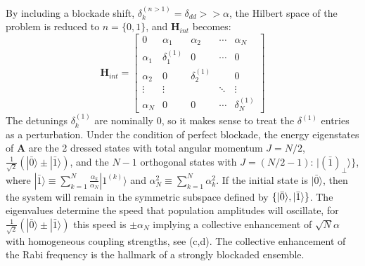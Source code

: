By including a blockade shift, $\delta^{(n>1)}_k = \delta_{dd} >> \alpha$, the Hilbert space of the problem is reduced to $n=\{0,1\}$, and $\mathbf{H}_{int}$ becomes:
\begin{equation}
  \label{eqn_hintsimp}
  \mathbf{H}_{int} = \begin{bmatrix}
    0 & \alpha_1 & \alpha_2 & \cdots & \alpha_N \\
    \alpha_1 & \delta_1^{(1)} & 0 & \cdots & 0 \\
    \alpha_2 & 0 & \delta_2^{(1)} &  & 0 \\
    \vdots & \vdots & & \ddots  & \vdots \\
    \alpha_N & 0 & 0 & \cdots & \delta_N^{(1)} 
  \end{bmatrix}
\end{equation}
The detunings $\delta_k^{(1)}$ are nominally 0, so it makes sense to treat the $\delta^{(1)}$ entries as a perturbation.
Under the condition of perfect blockade, the energy eigenstates of $\mathbf{A}$ are the 2 dressed states with total angular momentum $J = N/2$, $\frac{1}{\sqrt{2}}\left(|\bar{0}\rangle \pm |\bar{1}\rangle\right)$, and the $N-1$ orthogonal states with $J = (N/2 -1)$: $|(\bar{1})_{\perp}\rangle\}$, where $|\bar{1}\rangle \equiv \sum_{k=1}^N \frac{\alpha_k}{\alpha_N}|1^{(k)}\rangle$ and $\alpha_N^2 \equiv \sum_{k=1}^N \alpha_k^2$.
If the initial state is $|\bar{0}\rangle$, then the system will remain in the symmetric subspace defined by $\{|\bar{0}\rangle,|\bar{1}\rangle{}\}$.
The eigenvalues determine the speed that population amplitudes will oscillate, for $\frac{1}{\sqrt{2}}\left(|\bar{0}\rangle \pm |\bar{1}\rangle\right)$ this speed is $\pm \alpha_N$ implying a collective enhancement of $\sqrt{N}\alpha$ with homogeneous coupling strengths, see (c,d).
The collective enhancement of the Rabi frequency is the hallmark of a strongly blockaded ensemble\cite{GaeetanMiroshnychenkoWilkEtAl2009,DudinLiBarianiEtAl2012,Ebert2014,Zeiher2015}.

